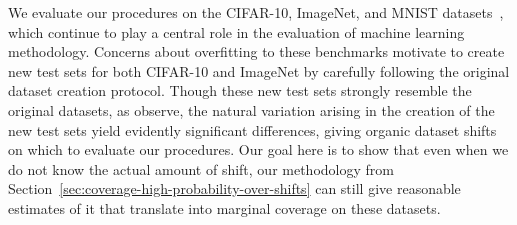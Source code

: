 We evaluate our procedures on the CIFAR-10,
ImageNet, and MNIST datasets~\cite{KrizhevskyHi09,
  RussakovskyDeSuKrSaMaHuKaKhBeBeFe15, LeCunCoBu98}, which
continue to play a central role in the evaluation of machine learning
methodology.
Concerns about overfitting to these benchmarks
motivate \citet*{RechtRoScSh19} to create new test sets for both
CIFAR-10 and ImageNet by carefully following the original dataset creation
protocol. Though these new test sets strongly resemble the original
datasets, as \citeauthor{RechtRoScSh19} observe, the natural variation
arising in the creation of the new test sets yield evidently significant
differences, giving organic dataset shifts on which to
evaluate our procedures.  Our goal here is to show that even when we do not know the actual amount of shift, our methodology from Section~\ref{sec:coverage-high-probability-over-shifts} can still give reasonable estimates of it that translate into marginal coverage on these datasets.

